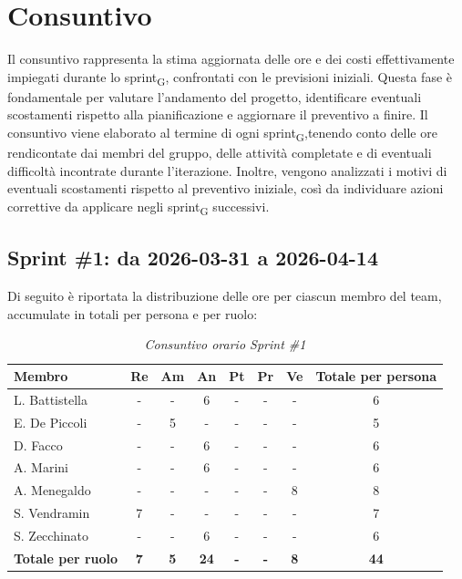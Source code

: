 \documentclass[a4paper, 10pt, colorlinks=true, linkcolor=black, urlcolor=blue, citecolor=blue, hidelinks]{article}
\renewcommand{\arraystretch}{1.2}
\begin{document}
\section{Consuntivo}
Il consuntivo rappresenta la stima aggiornata delle ore e dei costi effettivamente impiegati durante lo sprint\textsubscript{G}, confrontati con le previsioni iniziali. Questa fase è fondamentale per valutare l'andamento del progetto, identificare eventuali scostamenti rispetto alla pianificazione e aggiornare il preventivo a finire.
Il consuntivo viene elaborato al termine di ogni sprint\textsubscript{G},tenendo conto delle ore rendicontate dai membri del gruppo, delle attività completate e di eventuali difficoltà incontrate durante l'iterazione. Inoltre, vengono analizzati i motivi di eventuali scostamenti rispetto al preventivo iniziale, così da individuare azioni correttive da applicare negli sprint\textsubscript{G} successivi.

\subsection{Sprint \#1: da 2026-03-31 a 2026-04-14}

Di seguito è riportata la distribuzione delle ore per ciascun membro del team,
accumulate in totali per persona e per ruolo:
\begin{table}[H]
    \centering
    \renewcommand{\arraystretch}{1.4}
    \begin{tabular}{|l|c|c|c|c|c|c|c|}
        \hline
        \rowcolor{bluBitless!15}
        \textbf{Membro} & \textbf{Re} & \textbf{Am} & \textbf{An} & \textbf{Pt} & \textbf{Pr} & \textbf{Ve} & \textbf{Totale per persona} \\
        \hline
        L. Battistella & - & - & 6 & - & - & - & 6 \\ \hline
        E. De Piccoli & - & 5 & - & - & - & - & 5 \\ \hline
        D. Facco & - & - & 6 & - & - & - & 6 \\ \hline
        A. Marini & - & - & 6 & - & - & - & 6 \\ \hline
        A. Menegaldo & - & - & - & - & - & 8 & 8 \\ \hline
        S. Vendramin & 7 & - & - & - & - & - & 7 \\ \hline
        S. Zecchinato & - & - & 6 & - & - & - & 6 \\ \hline
        \rowcolor{bluBitless!8}
        \textbf{Totale per ruolo} & \textbf{7} & \textbf{5} & \textbf{24} & \textbf{-} & \textbf{-} & \textbf{8} & \textbf{44} \\
        \hline
    \end{tabular}
    \caption{\textit{Consuntivo orario Sprint \#1}}
\end{table}
\end{document}
